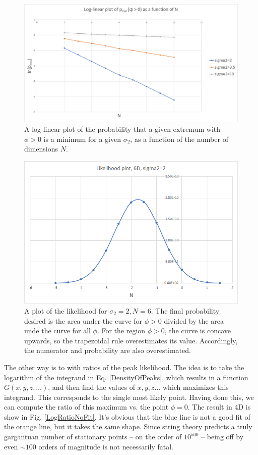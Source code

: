 \documentclass[12pt]{article}
\begin{document}
\begin{figure} 
  \centering
  \includegraphics[width=\linewidth]{Log-linear.png}
  \caption{A log-linear plot of the probability that a given extremum with $\phi > 0$ is a minimum for a given $\sigma_2$, as a function of the number of dimensions $N$.}
  \label{Log-Linear}
\end{figure}

\begin{figure}
  \centering
  \includegraphics[width=\linewidth]{LikelihoodPlot.png}
  \caption{A plot of the likelihood for $\sigma_2=2, N=6$. The final probability desired is the area under the curve for $\phi > 0$ divided by the area unde the curve for all $\phi$. For the region $\phi > 0$, the curve is concave upwards, so the trapezoidal rule overestimates its value. Accordingly, the numerator and probability are also overestimated.}
  \label{Likelihood}
\end{figure}

The other way is to with ratios of the peak likelihood. The idea is to take the logarithm of the integrand in Eq. \ref{DensityOfPeaks}, which results in a function $G(x, y, z, \ldots)$, and then find the values of $x, y, z \ldots$ which maximizes this integrand. This corresponds to the single most likely point. Having done this, we can compute the ratio of this maximum vs. the point $\phi = 0$. The result in 4D is show in Fig. \ref{LogRatioNoFit}. It's obvious that the blue line is not a good fit of the orange line, but it takes the same shape. Since string theory predicts a truly gargantuan number of stationary points -- on the order of $10^{500}$ -- being off by even $\sim100$ orders of magnitude is not necessarily fatal.
\end{document}
